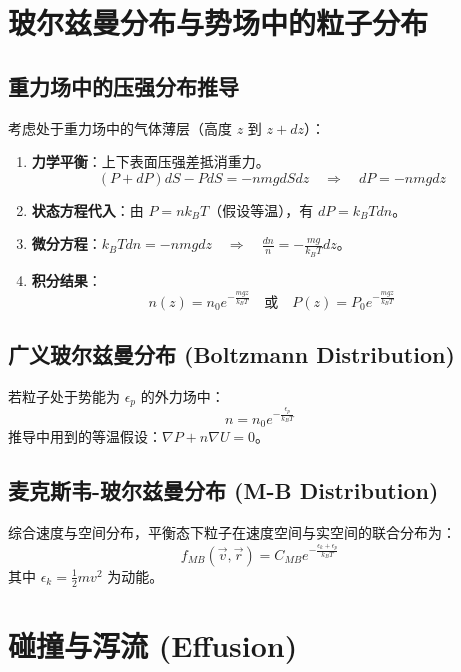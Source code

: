 \documentclass{article}
\begin{document}
\section{玻尔兹曼分布与势场中的粒子分布}

\subsection{重力场中的压强分布推导}
考虑处于重力场中的气体薄层（高度 $z$ 到 $z+dz$）：
\begin{enumerate}
    \item \textbf{力学平衡}：上下表面压强差抵消重力。
    \[ (P + dP) dS - P dS = - n m g dS dz \quad \Rightarrow \quad dP = -n m g dz \]
    \item \textbf{状态方程代入}：由 $P = n k_B T$（假设等温），有 $dP = k_B T dn$。
    \item \textbf{微分方程}：$k_B T dn = -n m g dz \quad \Rightarrow \quad \frac{dn}{n} = -\frac{mg}{k_B T} dz$。
    \item \textbf{积分结果}：
    \[ n(z) = n_0 e^{-\frac{mgz}{k_B T}} \quad \text{或} \quad P(z) = P_0 e^{-\frac{mgz}{k_B T}} \]
\end{enumerate}

\subsection{广义玻尔兹曼分布 (Boltzmann Distribution)}
若粒子处于势能为 $\epsilon_p$ 的外力场中：
\[ n = n_0 e^{-\frac{\epsilon_p}{k_B T}} \]
推导中用到的等温假设：$\nabla P + n \nabla U = 0$。

\subsection{麦克斯韦-玻尔兹曼分布 (M-B Distribution)}
综合速度与空间分布，平衡态下粒子在速度空间与实空间的联合分布为：
\[ f_{MB}(\vec{v}, \vec{r}) = C_{MB} e^{-\frac{\epsilon_k + \epsilon_p}{k_B T}} \]
其中 $\epsilon_k = \frac{1}{2}mv^2$ 为动能。

\section{碰撞与泻流 (Effusion)}
\end{document}
